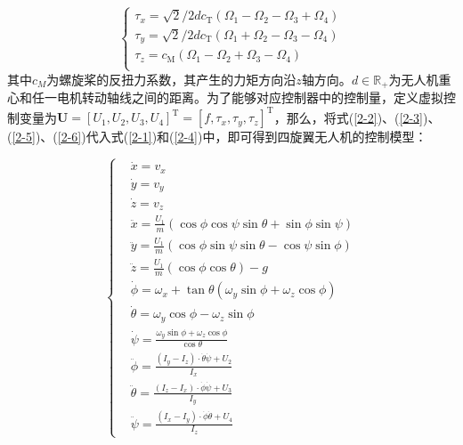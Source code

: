 \documentclass[lang=chs, degree=master, blindreview=false, winfonts=true]{yanputhesis}
\begin{document}
\begin{equation}
	\left\{ \begin{array}{l}
		\tau_x={\sqrt{2}}/{2}dc_\mathrm{T}\left(\Omega_1-\Omega_2-\Omega_3+\Omega_4\right)\\
		\tau_y={\sqrt{2}}/{2}dc_\mathrm{T}\left(\Omega_1+\Omega_2-\Omega_3-\Omega_4\right)\\
		\tau_z=c_\mathrm{M}\left(\Omega_1-\Omega_2+\Omega_3-\Omega_4\right)\\
	\end{array} \right.
		\label{2-6}
\end{equation}
其中$c_M$为螺旋桨的反扭力系数，其产生的力矩方向沿$z$轴方向。$d\in\mathbb{R}_+$为无人机重心和任一电机转动轴线之间的距离。为了能够对应控制器中的控制量，定义虚拟控制变量为$\bm{U}=\left[U_1,U_2,U_3,U_4\right]^\mathrm{T}=\left[f,\tau_x,\tau_y,\tau_z\right]^\mathrm{T}$，那么，将式(\ref{2-2})、(\ref{2-3})、(\ref{2-5})、(\ref{2-6})代入式(\ref{2-1})和(\ref{2-4})中，即可得到四旋翼无人机的控制模型：


\begin{equation}
		\left\{
	\begin{aligned}
		&\dot{x}=v_{x}\\
		&\dot{y}=v_{y}\\
		&\dot{z}=v_{z}\\
		&\ddot{x}=\frac{U_{1}}{m}\left(\cos\phi\cos\psi\sin\theta+\sin\phi\sin\psi\right)\\
		&\ddot{y}=\frac{U_{1}}{m}\left(\cos\phi\sin\psi\sin\theta-\cos\psi\sin\phi\right)\\
		&\ddot{z}=\frac{U_{1}}{m}\left(\cos\phi\cos\theta\right)-g\\
		&\dot{\phi}={\omega}_x+\tan\theta\left({\omega}_y\sin\phi+{\omega}_z\cos\phi\right)\\
		&\dot{\theta}={\omega}_y\cos\phi-{\omega}_z\sin\phi\\
		&\dot{\psi}=\frac{{\omega}_y\sin\phi+{\omega}_z\cos\phi}{\cos\theta}\\
		&\ddot{\phi}=\frac{(I_{y}-I_{z})\cdot \dot{\theta}\dot{\psi}+U_{2}}{I_{x}}\\
		&\ddot{\theta}=\frac{(I_{z}-I_{x})\cdot \dot{\phi}\dot{\psi}+U_{3}}{I_{y}}\\
		&\ddot{\psi}=\frac{(I_{x}-I_{y})\cdot \dot{\phi}\dot{\theta}+U_{4}}{I_{z}}\end{aligned}
	\right.
	\label{2-7}
\end{equation}
\end{document}
